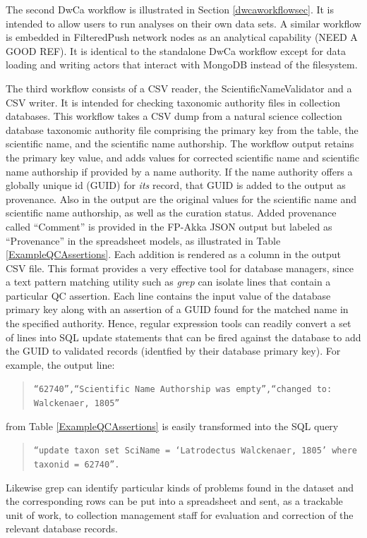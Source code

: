 \documentclass{article}
\begin{document}
The second DwCa workflow is illustrated in Section \ref{dwcaworkflowsec}.  It is intended to allow users to run analyses on their own data sets.  A similar workflow is embedded in FilteredPush network nodes as an analytical capability (NEED A GOOD REF).  It is identical to the standalone DwCa workflow except for data loading and writing actors that interact with MongoDB \citep{mongodb_inc_mongodb_2015} instead of the filesystem. 

The third workflow consists of a CSV reader, the ScientificNameValidator and a CSV writer. 
It is intended for checking taxonomic authority files in collection databases. 
This workflow takes a CSV dump from a natural science collection database taxonomic authority file comprising the primary key from the table, the scientific name, and the scientific name authorship. 
The workflow output retains the primary key value, and adds values for corrected scientific name and scientific name authorship if provided by a name authority. If the name authority offers a globally unique id (GUID) for \emph{its} record, that GUID is added to the output as provenance.
Also in the output are the original values for the scientific name and scientific name authorship, as well as the curation status. Added provenance called ``Comment'' is provided in the FP-Akka JSON output but labeled as ``Provenance'' in the spreadsheet models, as illustrated in Table \ref{ExampleQCAssertions}.  Each addition is rendered as a column in the output CSV file. 
This format provides a very effective tool for database managers, since a text pattern matching utility such as \emph{grep} \citep{wikiGrep}
can isolate lines that contain a particular QC assertion.  Each line contains the input value of the database primary key along with an assertion of a GUID found for the matched name in the specified authority. Hence, regular expression tools can readily convert a set of lines into SQL update statements that can be fired against the database to add the GUID to validated records (identfied by their database primary key).  For example, the output line: 
\begin{quotation}\noindent\texttt{``62740'',``Scientific Name Authorship was empty'',``changed to: Walckenaer, 1805''}\end{quotation}
from Table \ref{ExampleQCAssertions} is easily transformed into the SQL query 
\begin{quotation}\noindent\texttt{``update taxon set SciName = `Latrodectus Walckenaer, 1805' where taxonid = 62740''.}\end{quotation}
Likewise grep can identify particular kinds of problems found in the dataset and the corresponding rows can be put into a spreadsheet and sent, as a trackable unit of work, to collection management staff for evaluation and correction of the relevant database records.
\end{document}
